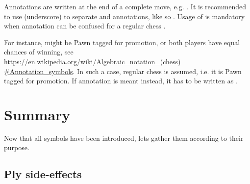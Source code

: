 Annotations are written at the end of a complete move, e.g. . It is recommended to use \alg{\_} (underscore)
to separate  and annotations, like so . Usage of \alg{\_} is mandatory when annotation can be
confused for a regular chess .

For instance,  might be Pawn tagged for promotion, or both players have equal chances of winning, see\\
\href{https://en.wikipedia.org/wiki/Algebraic\_notation\_(chess)#Annotation\_symbols}{https://en.wikipedia.org/wiki/Algebraic\_notation\_(chess)\\
\#Annotation\_symbols}. In such a case, regular chess  is assumed, i.e. it is Pawn tagged for promotion.
If annotation is meant instead, it has to be written as .

\clearpage %

\section*{Summary}
\label{sec:Appendix/Summary}

Now that all symbols have been introduced, lets gather them according to their purpose.

\subsection*{Ply side-effects}
\label{sec:Appendix/Summary/Ply side-effects}

